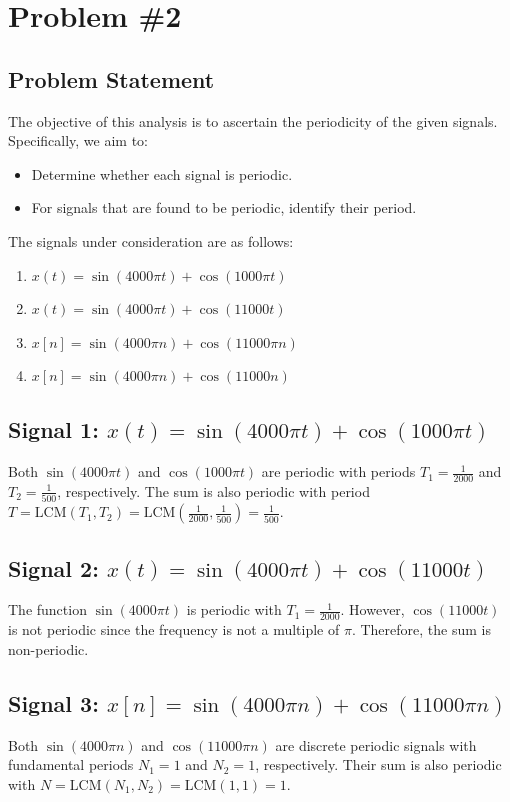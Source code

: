 \documentclass{article}
\begin{document}
\newpage
\section*{Problem \#2}
\subsection*{Problem Statement}
The objective of this analysis is to ascertain the periodicity of the given signals. Specifically, we aim to:
\begin{itemize}
    \item Determine whether each signal is periodic.
    \item For signals that are found to be periodic, identify their period.
\end{itemize}
The signals under consideration are as follows:
\begin{enumerate}
    \item \( x(t) = \sin(4000\pi t) + \cos(1000\pi t) \)
    \item \( x(t) = \sin(4000\pi t) + \cos(11000t) \)
    \item \( x[n] = \sin(4000\pi n) + \cos(11000\pi n) \)
    \item \( x[n] = \sin(4000\pi n) + \cos(11000n) \)
\end{enumerate}

\subsection*{Signal 1: \( x(t) = \sin(4000\pi t) + \cos(1000\pi t) \)}
Both \( \sin(4000\pi t) \) and \( \cos(1000\pi t) \) are periodic with periods \( T_1 = \frac{1}{2000} \) and \( T_2 = \frac{1}{500} \), respectively. 
The sum is also periodic with period \( T = \text{LCM}(T_1, T_2) = \text{LCM}\left(\frac{1}{2000}, \frac{1}{500}\right) = \frac{1}{500} \).

\subsection*{Signal 2: \( x(t) = \sin(4000\pi t) + \cos(11000t) \)}
The function \( \sin(4000\pi t) \) is periodic with \( T_1 = \frac{1}{2000} \). However, \( \cos(11000t) \) is not periodic since the frequency is not a multiple of \( \pi \). Therefore, the sum is non-periodic.

\subsection*{Signal 3: \( x[n] = \sin(4000\pi n) + \cos(11000\pi n) \)}
Both \( \sin(4000\pi n) \) and \( \cos(11000\pi n) \) are discrete periodic signals with fundamental periods \( N_1 = 1 \) and \( N_2 = 1 \), respectively. Their sum is also periodic with \( N = \text{LCM}(N_1, N_2) = \text{LCM}(1, 1) = 1 \).
\end{document}
